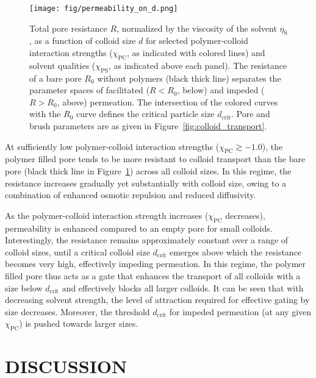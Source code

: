 \documentclass[12pt, a4paper]{article}
\begin{document}
\begin{figure}
    \centering
    \texttt{[image: fig/permeability\_on\_d.png]}
    \caption{
    Total pore resistance $R$, normalized by the viscosity of the solvent $\eta_\text{S}$, as a function of colloid size $d$ for selected polymer-colloid interaction strengths ($\chi_{\text{PC}}$, as indicated with colored lines) and solvent qualities ($\chi_{\text{PS}}$, as indicated above each panel). 
    The resistance of a bare pore $R_{0}$ without polymers (black thick line) separates the parameter spaces of facilitated ($R < R_{0}$, below) and impeded ($R > R_{0}$, above) permeation.
    The intersection of the colored curves with the $R_{0}$ curve defines the critical particle size $d_{\text{crit}}$.
    Pore and brush parameters are as given in Figure~\ref{fig:colloid_transport}. 
    }
    \label{fig:R_vs_d}
\end{figure}

At sufficiently low polymer-colloid interaction strengths ($\chi_{\text{PC}} \gtrsim -1.0$), the polymer filled pore tends to be more resistant to colloid transport than the bare pore (black thick line in Figure~\ref{fig:R_vs_d}) across all colloid sizes.
In this regime, the resistance increases gradually yet substantially with colloid size, owing to a combination of enhanced osmotic repulsion and reduced diffusivity.

As the polymer-colloid interaction strength increases ($\chi_{\text{PC}}$ decreases), permeability is enhanced compared to an empty pore for small colloids. 
Interestingly, the resistance remains approximately constant over a range of colloid sizes, until a critical colloid size $d_{\text{crit}}$ emerges above which the resistance becomes very high, effectively impeding permeation. 
In this regime, the polymer filled pore thus acts as a gate that enhances the transport of all colloids with a size below $d_{\text{crit}}$ and effectively blocks all larger colloids.
It can be seen that with decreasing solvent strength, the level of attraction required for effective gating by size decreases. 
Moreover, the threshold $d_{\text{crit}}$ for impeded permeation (at any given $\chi_{\text{PC}}$) is pushed towards larger sizes.


\section{DISCUSSION}
\end{document}
